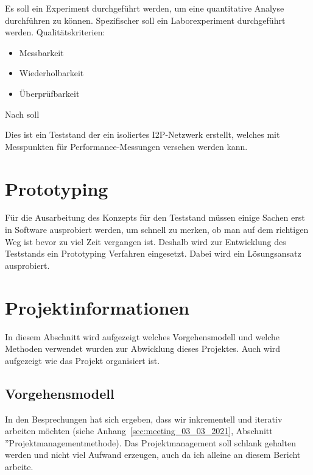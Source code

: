Es soll ein Experiment durchgeführt werden, um eine quantitative Analyse durchführen zu können.
Spezifischer soll ein Laborexperiment durchgeführt werden.
Qualitätskriterien:
\begin{itemize}
    \item Messbarkeit
    \item Wiederholbarkeit
    \item Überprüfbarkeit
\end{itemize}

Nach \parencite[S.~276]{helmut_balzert_wissenschaftliches_2017} soll 

Dies ist ein Teststand der ein isoliertes I2P-Netzwerk erstellt, welches mit Messpunkten für Performance-Messungen versehen werden kann.



\section{Prototyping}



Für die Ausarbeitung des Konzepts für den Teststand müssen einige Sachen erst in Software ausprobiert werden,
um schnell zu merken, ob man auf dem richtigen Weg ist bevor zu viel Zeit vergangen ist.
Deshalb wird zur Entwicklung des Teststands ein Prototyping Verfahren eingesetzt.
Dabei wird ein Lösungsansatz ausprobiert. 

\parencite{helmut_balzert_wissenschaftliches_nodate}


\section{Projektinformationen}\label{sec:projektinformationen}

In diesem Abschnitt wird aufgezeigt welches Vorgehensmodell und welche Methoden verwendet wurden zur Abwicklung dieses Projektes.
Auch wird aufgezeigt wie das Projekt organisiert ist.

\subsection{Vorgehensmodell}

 In den Besprechungen hat sich ergeben, dass wir inkrementell und iterativ arbeiten möchten
(siehe Anhang~\ref{sec:meeting_03_03_2021}, Abschnitt ''Projektmanagementmethode).
Das Projektmanagement soll schlank gehalten werden und nicht viel Aufwand erzeugen, auch da ich alleine an diesem Bericht arbeite.

